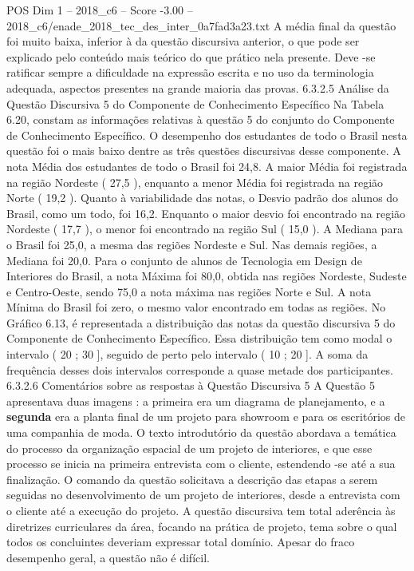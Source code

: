\begin{textsample}{POS Dim 1 – 2018\_c6 – Score -3.00 – 2018\_c6/enade\_2018\_tec\_des\_inter\_0a7fad3a23.txt}
A média final da questão foi muito baixa, inferior à da questão discursiva anterior, o que pode ser explicado pelo conteúdo mais teórico do que prático nela presente.
Deve -se ratificar sempre a dificuldade na expressão escrita e no uso da terminologia adequada, aspectos presentes na grande maioria das provas. 6.3.2.5 Análise da Questão Discursiva 5 do Componente de Conhecimento Específico Na Tabela 6.20, constam as informações relativas à questão 5 do conjunto do Componente de Conhecimento Específico.
O desempenho dos estudantes de todo o Brasil nesta questão foi o mais baixo dentre as três questões discursivas desse componente.
A nota Média dos estudantes de todo o Brasil foi 24,8.
A maior Média foi registrada na região Nordeste ( 27,5 ), enquanto a menor Média foi registrada na região Norte ( 19,2 ).
Quanto à variabilidade das notas, o Desvio padrão dos alunos do Brasil, como um todo, foi 16,2.
Enquanto o maior desvio foi encontrado na região Nordeste ( 17,7 ), o menor foi encontrado na região Sul ( 15,0 ).
A Mediana para o Brasil foi 25,0, a mesma das regiões Nordeste e Sul.
Nas demais regiões, a Mediana foi 20,0.
Para o conjunto de alunos de Tecnologia em Design de Interiores do Brasil, a nota Máxima foi 80,0, obtida nas regiões Nordeste, Sudeste e Centro-Oeste, sendo 75,0 a nota máxima nas regiões Norte e Sul.
A nota Mínima do Brasil foi zero, o mesmo valor encontrado em todas as regiões.
No Gráfico 6.13, é representada a distribuição das notas da questão discursiva 5 do Componente de Conhecimento Específico.
Essa distribuição tem como modal o intervalo ( 20 ; 30 ], seguido de perto pelo intervalo ( 10 ; 20 ].
A soma da frequência desses dois intervalos corresponde a quase metade dos participantes. 6.3.2.6 Comentários sobre as respostas à Questão Discursiva 5 A Questão 5 apresentava duas imagens : a primeira era um diagrama de planejamento, e a \textbf{segunda} era a planta final de um projeto para showroom e para os escritórios de uma companhia de moda.
O texto introdutório da questão abordava a temática do processo da organização espacial de um projeto de interiores, e que esse processo se inicia na primeira entrevista com o cliente, estendendo -se até a sua finalização.
O comando da questão solicitava a descrição das etapas a serem seguidas no desenvolvimento de um projeto de interiores, desde a entrevista com o cliente até a execução do projeto.
A questão discursiva tem total aderência às diretrizes curriculares da área, focando na prática de projeto, tema sobre o qual todos os concluintes deveriam expressar total domínio.
Apesar do fraco desempenho geral, a questão não é difícil.

\end{textsample}
